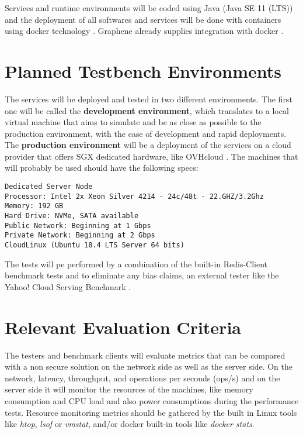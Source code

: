 Services and runtime environments will be coded using Java (Java SE 11 (LTS)) and the deployment of all softwares and services will be done with containers using docker technology \cite{docker:1}. Graphene already supplies integration with docker \cite{graphene_container:1}.

\section{Planned Testbench Environments} %
\label{sec:planned_testbench_environments}

The services will be deployed and tested in two different environments. The first one will be called the \textbf{development environment}, which translates to a local virtual machine that aims to simulate and be as close as possible to the production environment, with the ease of development and rapid deployments. The \textbf{production environment} will be a deployment of the services on a cloud provider that offers \gls{SGX} dedicated hardware, like OVHcloud \cite{ovhcloud:1}. The machines that will probably be used should have the following specs:

\lstset{numbers=none, caption=Machine Specifications, label=lst:machine_specs}
\begin{lstlisting}
Dedicated Server Node
Processor: Intel 2x Xeon Silver 4214 - 24c/48t - 22.GHZ/3.2Ghz
Memory: 192 GB
Hard Drive: NVMe, SATA available
Public Network: Beginning at 1 Gbps
Private Network: Beginning at 2 Gbps
CloudLinux (Ubuntu 18.4 LTS Server 64 bits)
\end{lstlisting}

The tests will pe performed by a combination of the built-in Redis-Client benchmark tests \cite{redis_benchmark_cli:1} and to eliminate any bias claims, an external tester like the Yahoo! Cloud Serving Benchmark \cite{yahoo_benchmark:1}.

\section{Relevant Evaluation Criteria} %
\label{sec:relevant_evaluation_criteria}

The testers and benchmark clients will evaluate metrics that can be compared with a non secure solution on the network side as well as the server side. On the network, latency, throughput, and operations per seconds (ops/s) and on the server side it will monitor the resources of the machines, like memory consumption and CPU load and also power consumptions during the performance tests. Resource monitoring metrics should be gathered by the built in Linux tools like \textit{htop}, \textit{lsof} or \textit{vmstat}, and/or docker built-in tools like \textit{docker stats}.

